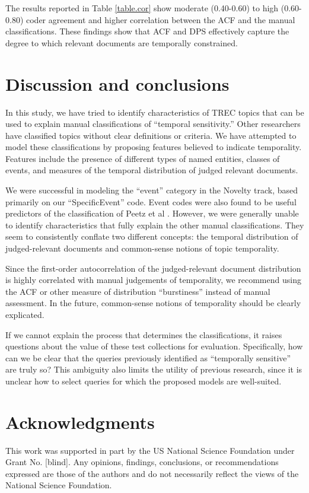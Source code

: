 \documentclass{sig-alternate-05-2015}
\begin{document}
The results reported in Table \ref{table.cor} show moderate (0.40-0.60) to high (0.60-0.80) coder agreement and higher correlation between the ACF and the manual classifications. These findings show that ACF and DPS effectively capture the degree to which relevant documents are temporally constrained. 

\section{Discussion and conclusions}

In this study, we have tried to identify characteristics of TREC topics that can be used to explain manual classifications of ``temporal sensitivity.'' Other researchers have classified topics without clear definitions or criteria. We have attempted to model these classifications by proposing features believed to indicate temporality.  Features include the presence of different types of named entities, classes of events, and measures of the temporal distribution of judged relevant documents.

We were successful in modeling the ``event'' category in the Novelty track, based primarily on our ``SpecificEvent'' code.  Event codes were also found to be useful predictors of the classification of Peetz et al \cite{Peetz2013a}.  However, we were generally unable to identify characteristics that fully explain the other manual classifications. They seem to consistently conflate two different concepts: the temporal distribution of judged-relevant documents and common-sense notions of topic temporality.  

Since the first-order autocorrelation of the judged-relevant document distribution is highly correlated with manual judgements of temporality, we recommend using the ACF or other measure of distribution ``burstiness'' instead of manual assessment.  In the future, common-sense notions of temporality should be clearly explicated.  

If we cannot explain the process that determines the classifications, it raises questions about the value of these test collections for evaluation. Specifically, how can we be clear that the queries previously identified as ``temporally sensitive'' are truly so? This ambiguity also limits the utility of previous research, since it is unclear how to select queries for which the proposed models are well-suited.	

\section{Acknowledgments}
This work was supported in part by the US National Science Foundation under Grant No. [blind]. Any opinions, findings, conclusions, or recommendations expressed are those of the authors and do not necessarily reflect the views of the National Science Foundation. 


  
\end{document}
